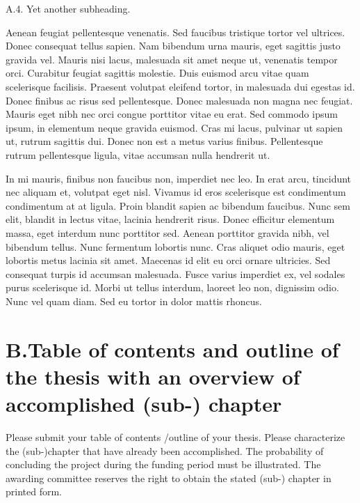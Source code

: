 \documentclass[11pt, notitlepage]{article} %
\begin{document}
\begin{description}
	\item[A.4. Yet another subheading.]{}
\end{description}

Aenean feugiat pellentesque venenatis. Sed faucibus tristique tortor vel ultrices. Donec consequat tellus sapien. Nam bibendum urna mauris, eget sagittis justo gravida vel. Mauris nisi lacus, malesuada sit amet neque ut, venenatis tempor orci. Curabitur feugiat sagittis molestie. Duis euismod arcu vitae quam scelerisque facilisis. Praesent volutpat eleifend tortor, in malesuada dui egestas id. Donec finibus ac risus sed pellentesque. Donec malesuada non magna nec feugiat. Mauris eget nibh nec orci congue porttitor vitae eu erat. Sed commodo ipsum ipsum, in elementum neque gravida euismod. Cras mi lacus, pulvinar ut sapien ut, rutrum sagittis dui. Donec non est a metus varius finibus. Pellentesque rutrum pellentesque ligula, vitae accumsan nulla hendrerit ut.

In mi mauris, finibus non faucibus non, imperdiet nec leo. In erat arcu, tincidunt nec aliquam et, volutpat eget nisl. Vivamus id eros scelerisque est condimentum condimentum at at ligula. Proin blandit sapien ac bibendum faucibus. Nunc sem elit, blandit in lectus vitae, lacinia hendrerit risus. Donec efficitur elementum massa, eget interdum nunc porttitor sed. Aenean porttitor gravida nibh, vel bibendum tellus. Nunc fermentum lobortis nunc. Cras aliquet odio mauris, eget lobortis metus lacinia sit amet. Maecenas id elit eu orci ornare ultricies. Sed consequat turpis id accumsan malesuada. Fusce varius imperdiet ex, vel sodales purus scelerisque id. Morbi ut tellus interdum, laoreet leo non, dignissim odio. Nunc vel quam diam. Sed eu tortor in dolor mattis rhoncus.


\newpage
\section*{B.Table of contents and outline of the thesis with an overview of accomplished (sub-) chapter}
Please submit your table of contents /outline of your thesis. Please characterize the (sub-)chapter that have already been accomplished. The probability of concluding the project during the funding period  must  be  illustrated.  The awarding committee reserves the right to obtain the stated (sub-) chapter in printed form.
\end{document}
